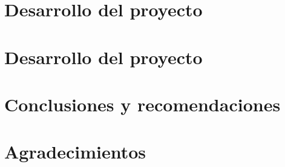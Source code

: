 \documentclass{sig-alternate}
\begin{document}
\section{Desarrollo del proyecto}

\section{Desarrollo del proyecto}


\section{Conclusiones y recomendaciones}



\section{Agradecimientos}

%



%
%






\end{document}
